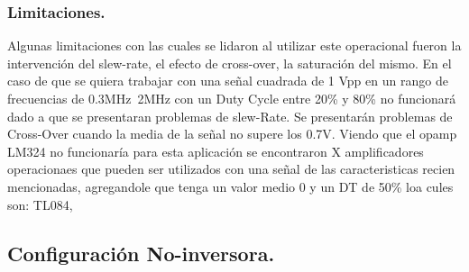 \subsubsection{Limitaciones.}
Algunas limitaciones con las cuales se lidaron al utilizar este operacional fueron la intervención del slew-rate, el efecto de cross-over, la saturación del mismo.
En el caso de que se quiera trabajar con una señal cuadrada  de 1 Vpp en un rango de frecuencias de 0.3MHz~2MHz con un Duty Cycle entre 20\% y 80\%  no funcionará dado a que se presentaran problemas de slew-Rate. Se presentarán problemas de Cross-Over cuando la media de la señal no supere los 0.7V.
Viendo que el opamp LM324 no funcionaría para esta aplicación se encontraron X amplificadores operacionaes que pueden ser utilizados con una señal de las caracteristicas recien mencionadas, agregandole que tenga un valor medio 0 y un DT de 50\% loa cules son: TL084,
\subsection{Configuración No-inversora.}
